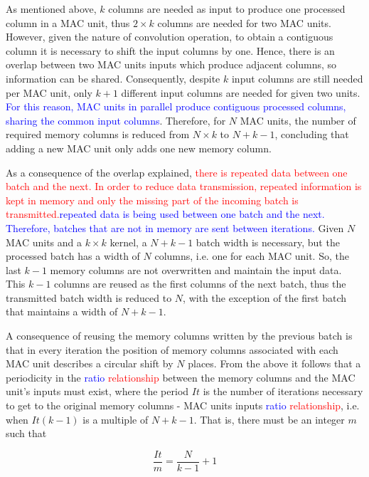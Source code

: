 \documentclass[conference,compsoc]{IEEEtran}
\begin{document}
As mentioned above, $k$ columns are needed as input to produce one processed
column in a MAC unit, thus $2 \times k$ columns are needed for two MAC units.
However, given the nature of convolution operation, to obtain a contiguous
column it is necessary to shift the input columns by one. Hence, there is an
overlap between two MAC units inputs which produce adjacent columns, so information can
be shared.
Consequently, despite $k$ input columns are still needed per MAC unit, only $k+1$
different input columns are needed for given two units. 
\textcolor{blue}{For this reason, MAC units in parallel produce contiguous processed
columns, sharing the common input columns}. 
Therefore, for $N$ MAC units, the number of required memory columns is reduced from $N \times k$ to $N+k-1$, concluding
that adding a new MAC unit only adds one new memory column.

As a consequence of the overlap explained, \textcolor{red}{there is repeated data
between one batch and the next. In order to reduce data transmission, repeated
information is kept in memory and only the missing part of 
the incoming batch is transmitted.}\textcolor{blue}{repeated data is being used
between one batch and the next. Therefore, batches that are not in memory are
sent between iterations.} Given $N$ MAC units and a $k\times k$ kernel, a $N+k-1$
batch width is necessary, but the processed batch has a width of $N$ columns, i.e.
one for each MAC unit. So, the last $k-1$ memory columns are not overwritten and
maintain the input data. This $k-1$ columns are reused as the first columns
of the next batch, thus the transmitted batch width is reduced to $N$, with the exception of
the first batch that maintains a width of $N+k-1$.

A consequence of reusing the memory columns written by the previous batch is
that in every iteration the position of memory columns associated with each
MAC unit describes a circular shift by $N$ places. From the above it
follows that a periodicity in the \textcolor{blue}{ratio}
\textcolor{red}{relationship} between the memory columns and the
MAC unit's inputs must exist, where the period $It$ is the number of
iterations necessary to get to the original memory columns - MAC units
inputs \textcolor{blue}{ratio} \textcolor{red}{relationship}, i.e. when $It(k-1)$ is a multiple of $N+k-1$. That is, there
must be an integer $m$ such that 

\begin{equation}\label{niter}
  \frac{It}{m} = \frac{N}{k-1} + 1
\end{equation}
\end{document}

